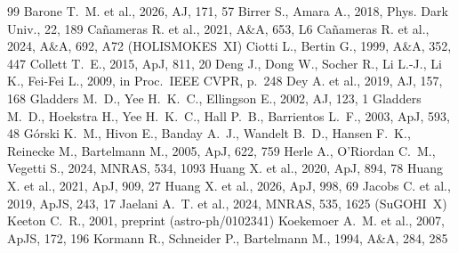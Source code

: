 \documentclass[fleqn,usenatbib]{rasti}
\begin{document}
\FloatBarrier
\begin{thebibliography}{99}
Barone T.~M. et al., 2026, AJ, 171, 57
Birrer S., Amara A., 2018, Phys. Dark Univ., 22, 189
Ca\~{n}ameras R. et al., 2021, A\&A, 653, L6
Ca\~{n}ameras R. et al., 2024, A\&A, 692, A72 (HOLISMOKES~XI)
Ciotti L., Bertin G., 1999, A\&A, 352, 447
Collett T.~E., 2015, ApJ, 811, 20
Deng J., Dong W., Socher R., Li L.-J., Li K., Fei-Fei L., 2009, in Proc.\
IEEE CVPR, p.\ 248
Dey A. et al., 2019, AJ, 157, 168
Gladders M.~D., Yee H.~K.~C., Ellingson E., 2002, AJ, 123, 1
Gladders M.~D., Hoekstra H., Yee H.~K.~C., Hall P.~B., Barrientos L.~F.,
2003, ApJ, 593, 48
G\'{o}rski K.~M., Hivon E., Banday A.~J., Wandelt B.~D., Hansen F.~K.,
Reinecke M., Bartelmann M., 2005, ApJ, 622, 759
Herle A., O'Riordan C.~M., Vegetti S., 2024, MNRAS, 534, 1093
Huang X. et al., 2020, ApJ, 894, 78
Huang X. et al., 2021, ApJ, 909, 27
Huang X. et al., 2026, ApJ, 998, 69
Jacobs C. et al., 2019, ApJS, 243, 17
Jaelani A.~T. et al., 2024, MNRAS, 535, 1625 (SuGOHI~X)
Keeton C.~R., 2001, preprint (astro-ph/0102341)
Koekemoer A.~M. et al., 2007, ApJS, 172, 196
Kormann R., Schneider P., Bartelmann M., 1994, A\&A, 284, 285

\end{thebibliography}
\end{document}
